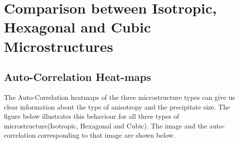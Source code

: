\documentclass[12pt, a4paper]{report}
\begin{document}

\section{Comparison between Isotropic, Hexagonal and Cubic Microstructures}
\subsection{Auto-Correlation Heat-maps}
The Auto-Correlation heatmaps of the three microstructure types can give us clear information about the type of anisotropy and the precipitate size. The figure below illustrates this behaviour for all three types of microstructure(Isotropic, Hexagonal and Cubic). The image and the auto-correlation corresponding to that image are shown below.
\end{document}
